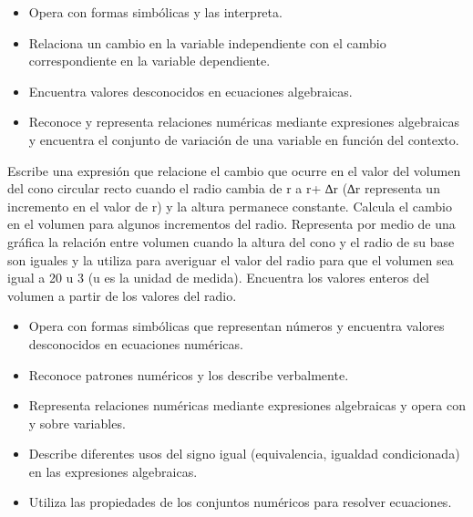 


\evidencias

\begin{itemize}
  \item Opera con formas simbólicas y las interpreta.
  \item Relaciona un cambio en la variable independiente con el cambio correspondiente en la variable dependiente.
  \item Encuentra valores desconocidos en ecuaciones algebraicas.
  \item Reconoce y representa relaciones numéricas mediante expresiones algebraicas y encuentra el conjunto de variación de una variable en función del contexto.
\end{itemize}

\ejemplo

Escribe una expresión que relacione el cambio que ocurre en el valor del volumen del cono circular recto cuando el radio cambia de r a r+ ∆r (∆r representa un incremento en el valor de r) y la altura permanece constante. Calcula el cambio en el volumen para algunos incrementos del radio. Representa por medio de una gráfica la relación entre volumen cuando la altura del cono y el radio de su base son iguales y la utiliza para averiguar el valor del radio para que el volumen sea igual a 20 u 3 (u es la unidad de medida). Encuentra los valores enteros del volumen a partir de los valores del radio.



\evidencias

\begin{itemize}
  \item Opera con formas simbólicas que representan números y encuentra valores desconocidos en ecuaciones numéricas.
  \item Reconoce patrones numéricos y los describe verbalmente.
  \item Representa relaciones numéricas mediante expresiones algebraicas y opera con y sobre variables.
  \item Describe diferentes usos del signo igual (equivalencia, igualdad condicionada) en las expresiones algebraicas.
  \item Utiliza las propiedades de los conjuntos numéricos para resolver ecuaciones.
\end{itemize}

